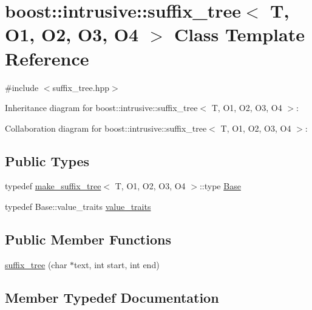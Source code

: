\hypertarget{classboost_1_1intrusive_1_1suffix__tree}{}\section{boost\+:\+:intrusive\+:\+:suffix\+\_\+tree$<$ T, O1, O2, O3, O4 $>$ Class Template Reference}
\label{classboost_1_1intrusive_1_1suffix__tree}


{\ttfamily \#include $<$suffix\+\_\+tree.\+hpp$>$}



Inheritance diagram for boost\+:\+:intrusive\+:\+:suffix\+\_\+tree$<$ T, O1, O2, O3, O4 $>$\+:


Collaboration diagram for boost\+:\+:intrusive\+:\+:suffix\+\_\+tree$<$ T, O1, O2, O3, O4 $>$\+:
\subsection*{Public Types}
\begin{DoxyCompactItemize}
\item 
typedef \hyperlink{structboost_1_1intrusive_1_1make__suffix__tree}{make\+\_\+suffix\+\_\+tree}$<$ T, O1, O2, O3, O4 $>$\+::type \hyperlink{classboost_1_1intrusive_1_1suffix__tree_a4e4d560ba016e68c15ecf4c4f88331e5}{Base}
\item 
typedef Base\+::value\+\_\+traits \hyperlink{classboost_1_1intrusive_1_1suffix__tree_a20b10e59065c1615575e5f76038289fd}{value\+\_\+traits}
\end{DoxyCompactItemize}
\subsection*{Public Member Functions}
\begin{DoxyCompactItemize}
\item 
\hyperlink{classboost_1_1intrusive_1_1suffix__tree_a3a428cbd18b652d8bfea604a3edb0414}{suffix\+\_\+tree} (char $\ast$text, int start, int end)
\end{DoxyCompactItemize}


\subsection{Member Typedef Documentation}
\mbox{\label{classboost_1_1intrusive_1_1suffix__tree_a4e4d560ba016e68c15ecf4c4f88331e5}} 
